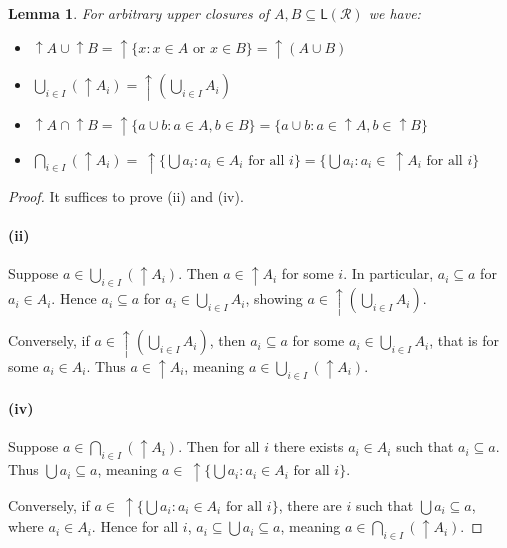 \documentclass[12pt]{article}
\theoremstyle{definition}
\theoremstyle{plain}
\newtheorem{lemma}{Lemma}[section]
\theoremstyle{plain}
\theoremstyle{plain}
\theoremstyle{plain}
\theoremstyle{remark}
\theoremstyle{remark}
\newcommand{\mc}[1]{\mathcal{#1}}
\newcommand{\sub}{\subseteq}
\newcommand{\low}{\mathsf{L}}
\newcommand{\upc}[1]{{\uparrow #1}}
\begin{document}
\begin{tcolorbox}[title = Calculation Rules]
	\begin{lemma}\label{lem:calc} For arbitrary upper closures of $A,B \sub \low(\mc{R})$ we have:
		\begin{itemize}
		\item[(i)] $\upc{A} \cup \upc{B} = \uparrow \{x : x \in A \text{ or }  x \in B\} = \uparrow (A \cup B)$
		\item[(ii)] $\bigcup_{i \in I}(\uparrow A_i) = \uparrow (\bigcup_{i \in I}A_i)$
		\item[(iii)]$\upc{A} \cap \upc{B} = \uparrow \{ a \cup b: a \in A, b \in B \} = \{ a \cup b: a \in \upc{A}, b \in \upc{B} \}$ 
		\item[(iv)]$\bigcap_{i \in I}(\upc {A_i})  = \: \uparrow \!\!\! \{\bigcup a_i: a_i \in A_i \text{ for all } i \} =\{\bigcup a_i: a_i \in \: \upc{A_i} \text{ for all } i \}$
		\end{itemize}
	\end{lemma}
	\begin{proof}
		It suffices to prove (ii) and (iv). 
		
		\paragraph{(ii)} Suppose $a \in \bigcup_{i \in I}(\uparrow A_i)$. Then $a \in \upc{A_i}$ for some $i$. In particular, $a_i \sub a$ for $a_i \in A_i$. Hence $a_i \sub a$ for $a_i \in \bigcup_{i \in I}A_i$, showing $a \in \upc{(\bigcup_{i \in I}A_i)}$. 
		
		Conversely, if $a \in \upc{(\bigcup_{i \in I}A_i)}$, then $a_i \sub a$ for some $a_i \in \bigcup_{i \in I}A_i$, that is for some $a_i \in A_i$. Thus $a \in \upc{A_i}$, meaning $a \in \bigcup_{i \in I}(\uparrow A_i)$.
		
		\paragraph{(iv)} Suppose $a \in \bigcap_{i \in I}(\uparrow A_i)$. Then for all $i$ there exists $a_i \in A_i$ such that $a_i \sub a$. Thus $\bigcup a_i \sub a$, meaning $a \in \: \uparrow \!\! \{\bigcup a_i: a_i \in A_i \text{ for all } i \}$.
		
		Conversely, if $a \in \: \uparrow \!\!\! \{\bigcup a_i: a_i \in A_i \text{ for all } i \}$, there are $i$ such that $\bigcup a_i \sub a$, where $a_i \in A_i$. Hence for all $i$, $a_i \sub \bigcup a_i \sub a$, meaning $a \in \bigcap_{i \in I}(\uparrow A_i)$.
		

\end{proof}
\end{tcolorbox}
\end{document}
